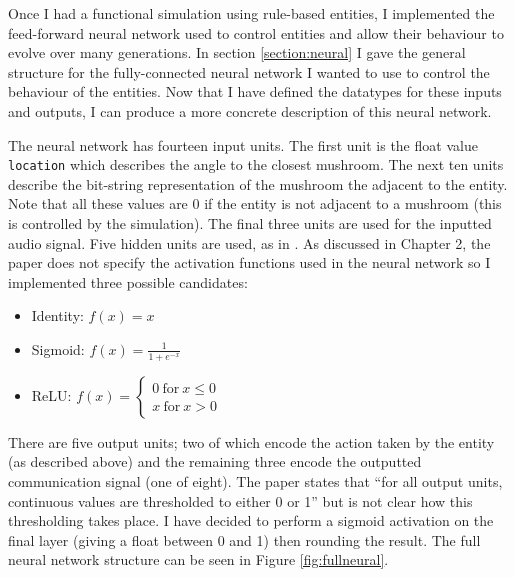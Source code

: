 \documentclass[12pt,a4paper,twoside,openright]{report}
\begin{document}
Once I had a functional simulation using rule-based entities, I implemented the feed-forward neural network used to control entities and allow their behaviour to evolve over many generations. In section \ref{section:neural} I gave the general structure for the fully-connected neural network I wanted to use to control the behaviour of the entities. Now that I have defined the datatypes for these inputs and outputs, I can produce a more concrete description of this neural network. 

The neural network has fourteen input units. The first unit is the float value \texttt{location} which describes the angle to the closest mushroom. The next ten units describe the bit-string representation of the mushroom the adjacent to the entity. Note that all these values are 0 if the entity is not adjacent to a mushroom (this is controlled by the simulation). The final three units are used for the inputted audio signal. Five hidden units are used, as in \citet{Cangelosi1998}. As discussed in Chapter 2, the paper does not specify the activation functions used in the neural network so I implemented three possible candidates:

\begin{itemize}
	\item Identity: $f(x) = x$
	\item Sigmoid: $f(x) = \frac{1}{1+e^{-x}}$
	\item ReLU: $ f(x) = 
    \left\{
        \begin{array}{ll}
          0~\mathrm{for}~x \leq 0 \\
          x~\mathrm{for}~x > 0
        \end{array}
      \right.
      $
\end{itemize}

There are five output units; two of which encode the action taken by the entity (as described above) and the remaining three encode the outputted communication signal (one of eight). The paper states that ``for all output units, continuous values are thresholded to either 0 or 1'' but is not clear how this thresholding takes place. I have decided to perform a sigmoid activation on the final layer (giving a float between 0 and 1) then rounding the result. The full neural network structure can be seen in Figure \ref{fig:fullneural}.
\end{document}
